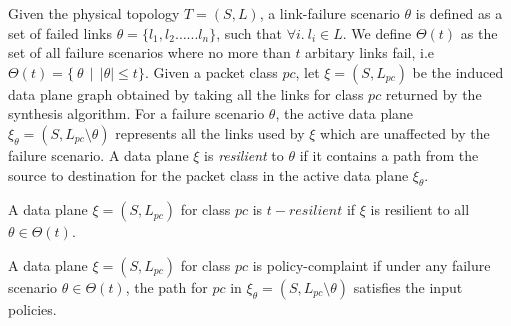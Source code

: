Given the physical topology $T=(S,L)$, a link-failure
scenario $\theta$ is defined as a set of failed links $\theta = \{l_1, l_2 \ldots ... l_n\}$,
such that $\forall i.\ l_i \in L$.
	We define $\Theta(t)$ as the set of all failure scenarios where no more than $t$
	arbitary links fail, i.e $\Theta(t) = \{ \ \theta \ \ | \ \ |\theta| \leq t\}$.
Given a packet class $pc$,
let $\xi = (S, L_{pc})$ be the induced data plane graph obtained
by taking all the links for class $pc$ returned by the synthesis algorithm. For a failure scenario
$\theta$, the active data plane $\xi_\theta = (S, L_{pc} \setminus \theta)$ represents
all the links used by $\xi$ which are unaffected by the failure scenario. A data
plane $\xi$ is {\em resilient} to $\theta$ if it contains a path from the source to 
destination for the packet class in the active data plane $\xi_\theta$.
\begin{mydef}[Resilience]
	A data plane $\xi = (S, L_{pc})$ for class $pc$ is $t-resilient$ if $\xi$ is 
	resilient to all $\theta \in \Theta(t)$.
\end{mydef}
\begin{mydef}
	A data plane $\xi = (S, L_{pc})$ for class $pc$ is policy-complaint if under
	any failure scenario $\theta \in \Theta(t)$,  the path for $pc$ in 
	$\xi_\theta=(S, L_{pc} \setminus \theta)$ satisfies the input policies. 
\end{mydef}
